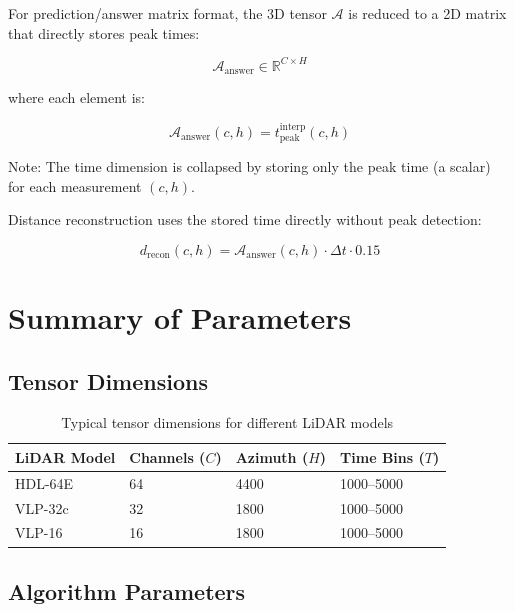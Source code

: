 \documentclass[11pt]{article}
\begin{document}
For prediction/answer matrix format, the 3D tensor $\bm{\mathcal{A}}$ is reduced to a 2D matrix that directly stores peak times:

\begin{equation}
\bm{\mathcal{A}}_{\text{answer}} \in \mathbb{R}^{C \times H}
\end{equation}

where each element is:

\begin{equation}
\mathcal{A}_{\text{answer}}(c, h) = t_{\text{peak}}^{\text{interp}}(c, h)
\end{equation}

Note: The time dimension is collapsed by storing only the peak time (a scalar) for each measurement $(c, h)$.

Distance reconstruction uses the stored time directly without peak detection:

\begin{equation}
d_{\text{recon}}(c, h) = \mathcal{A}_{\text{answer}}(c, h) \cdot \Delta t \cdot 0.15
\end{equation}

\section{Summary of Parameters}

\subsection{Tensor Dimensions}

\begin{table}[h]
\centering
\begin{tabular}{|l|l|l|l|}
\hline
\textbf{LiDAR Model} & \textbf{Channels ($C$)} & \textbf{Azimuth ($H$)} & \textbf{Time Bins ($T$)} \\
\hline
HDL-64E & 64 & 4400 & 1000--5000 \\
VLP-32c & 32 & 1800 & 1000--5000 \\
VLP-16 & 16 & 1800 & 1000--5000 \\
\hline
\end{tabular}
\caption{Typical tensor dimensions for different LiDAR models}
\end{table}

\subsection{Algorithm Parameters}
\end{document}
